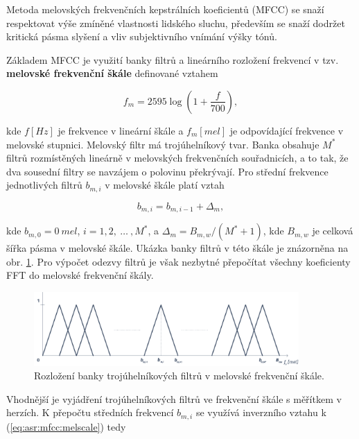 Metoda melovských frekvenčních kepstrálních koeficientů (MFCC) se snaží respektovat výše zmíněné vlastnosti lidského sluchu, především se snaží dodržet kritická pásma slyšení a vliv subjektivního vnímání výšky tónů.

Základem MFCC je využití banky filtrů a lineárního rozložení frekvencí v tzv. \textbf{melovské frekvenční škále} definované vztahem

\begin{equation}
  f_m = 2595 \log \left(1 + \frac{f}{700}\right),
  \label{eq:asr:mfcc:melscale}
\end{equation}

\noindent kde $f \left[Hz\right]$ je frekvence v lineární škále a $f_m \left[mel\right]$ je odpovídající frekvence v melovské stupnici. Melovský filtr má trojúhelníkový tvar. Banka obsahuje $M^{*}$ filtrů rozmístěných lineárně v melovských frekvenčních souřadnicích, a to tak, že dva sousední filtry se navzájem o polovinu překrývají. Pro střední frekvence jednotlivých filtrů $b_{m,i}$ v melovské škále platí vztah

\begin{equation}
  b_{m,i} = b_{m,i-1} + \Delta_{m},
  \label{eq:asr:mfcc:freq}
\end{equation}

\noindent kde $b_{m, 0} = 0\ mel$, $i = 1, 2,\ \dots\ , M^{*}$, a $\Delta_m = B_{m,w} / (M^{*} + 1)$, kde $B_{m,w}$ je celková šířka pásma v melovské škále. Ukázka banky filtrů v této škále je znázorněna na obr. \ref{fig:asr:mfcc:bank:mel}. Pro výpočet odezvy filtrů je však nezbytné přepočítat všechny koeficienty FFT do melovské frekvenční škály.

\begin{figure}[hbpt]
  \centering
  \includegraphics[width=0.9\textwidth]{./ch4-asr/img/filter_bank-mel.pdf}
  \caption{Rozložení banky trojúhelníkových filtrů v melovské frekvenční škále.}
  \label{fig:asr:mfcc:bank:mel}
\end{figure}

\noindent Vhodnější je vyjádření trojúhelníkových filtrů ve frekvenční škále s měřítkem v herzích. K přepočtu středních frekvencí $b_{m,i}$ se využívá inverzního vztahu k (\ref{eq:asr:mfcc:melscale}) tedy

